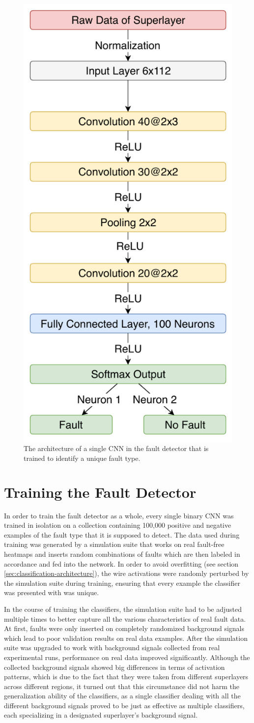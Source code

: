 \begin{figure}[h]
  \centering
  \includegraphics[width=.4\textwidth]{../figures/fault_architecture}
  \caption{The architecture of a single CNN in the fault detector that
  is trained to identify a unique fault type.}
  \label{fig:fault-architecture}
\end{figure}

\section{Training the Fault Detector}

In order to train the fault detector as a whole, every single binary
CNN was trained in isolation on a collection containing 100,000
positive and negative examples of the fault type that it is
supposed to detect. The data used during training was
generated by a simulation suite that works on real fault-free heatmaps
and inserts random combinations of faults which are then labeled in
accordance and fed into the network. In order to avoid overfitting
(see section \ref{sec:classification-architecture}), the wire activations
were randomly perturbed by the simulation suite during training,
ensuring that every example the classifier was presented with was
unique.

In the course of training the classifiers, the simulation suite had to
be adjusted multiple times to better capture all the various
characteristics of real fault data. At first, faults were only
inserted on completely randomized background signals which lead to
poor validation results on real data examples. After the simulation
suite was upgraded to work with background signals collected from real
experimental runs, performance on real data improved
significantly. Although the collected background signals
showed big differences in terms of activation patterns, which is due to
the fact that they were taken from different superlayers across
different regions, it turned out
that this circumstance did not harm the generalization ability of the
classifiers, as a single classifier dealing with all the different
background signals proved to be just as effective as multiple
classifiers, each specializing in a designated superlayer's background
signal.

